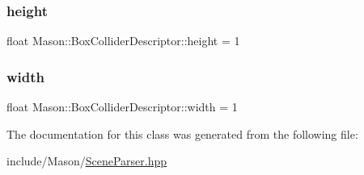 \subsubsection{\texorpdfstring{height}{height}}
{\footnotesize\ttfamily float Mason\+::\+Box\+Collider\+Descriptor\+::height = 1}

\hypertarget{class_mason_1_1_box_collider_descriptor_ae147e1798e9ef8855faaf51ce4bac9c4}{}\label{class_mason_1_1_box_collider_descriptor_ae147e1798e9ef8855faaf51ce4bac9c4} 
\subsubsection{\texorpdfstring{width}{width}}
{\footnotesize\ttfamily float Mason\+::\+Box\+Collider\+Descriptor\+::width = 1}



The documentation for this class was generated from the following file\+:\begin{DoxyCompactItemize}
\item 
include/\+Mason/\hyperlink{_scene_parser_8hpp}{Scene\+Parser.\+hpp}\end{DoxyCompactItemize}
